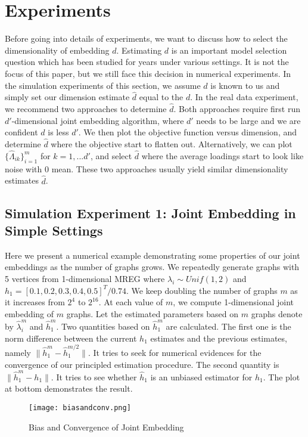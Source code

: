 \documentclass[10pt,journal,compsoc]{IEEEtran}
\begin{document}
\section{Experiments}
Before going into details of experiments, we want to discuss how to select the dimensionality of embedding $d$. Estimating $d$ is an important model selection question which has been studied for years under various settings. It is not the focus of this paper, but we still face this decision in numerical experiments. In the simulation experiments of this section, we assume $d$ is known to us and simply set our dimension estimate $\hat{d}$ equal to the $d$. In the real data experiment, we recommend two approaches to determine $\hat{d}$. Both approaches require first run $d'$-dimensional joint embedding algorithm, where $d'$ needs to be large and we are confident $d$ is less $d'$. We then plot the objective function versus dimension, and determine $\hat{d}$ where the objective start to flatten out. Alternatively, we can plot $\{\hat{\Lambda}_{ik}\}_{i=1}^m$ for $k=1,...d'$, and select $\hat{d}$ where the average loadings start to look like noise with $0$ mean. These two approaches usually yield similar dimensionality estimates $\hat{d}$. 

\subsection{Simulation Experiment 1: Joint Embedding in Simple Settings}
\noindent Here we present a numerical example demonstrating some properties
of our joint embeddings as the number of graphs grows. We repeatedly generate graphs with 5 vertices from 1-dimensional MREG where $\lambda_i \sim Unif(1,2)$ and $h_1=[0.1,0.2,0.3,0.4,0.5]^T/0.74$. We keep doubling the number of graphs $m$ as it increases from $2^4$ to $2^{16}$. At each value of $m$, we compute 1-dimensional joint embedding of $m$ graphs. Let the estimated parameters based on $m$ graphs denote by $\hat{\lambda}_i^m$ and $\hat{h}_1^m$. Two quantities based on $\hat{h}_1^m$ are calculated. The first one is the norm difference between the current $h_1$ estimates and the previous estimates, namely $\|\hat{h}_1^m-\hat{h}_1^{m/2}\|$. It tries to seek for numerical evidences for the convergence of our principled estimation procedure. The second quantity is $\|\hat{h}^m_1-h_1\|$. It tries to see whether $\hat{h}_1$ is an unbiased estimator for $h_1$. The plot at bottom demonstrates the result. \\

\begin{figure}[!htbp]
	\centering
	\texttt{[image: biasandconv.png]}
	\caption{Bias and Convergence of Joint Embedding}
\end{figure}
\end{document}
